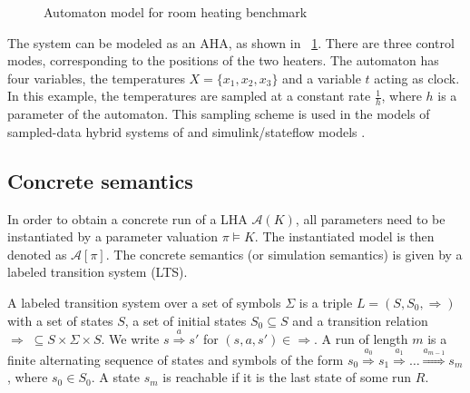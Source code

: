 \documentclass{llncs}
\newcommand{\A}{\ensuremath{\mathcal{A}}}
\newcommand{\Trans}[1]{\ensuremath{\overset{#1}{\Rightarrow}}}
\begin{document}
\begin{example}
\begin{figure}[tb]
  \caption{Automaton model for room heating benchmark}\label{fig:rhbaut}
\end{figure}

The system can be modeled as an AHA, as shown in
\figurename~\ref{fig:rhbaut}. There are three control modes, corresponding
to the positions of the two heaters. The automaton has four variables,
the temperatures $X = \{x_1, x_2, x_3\}$ and a variable $t$ acting as
clock. In this example, the temperatures are sampled at a constant
rate $\frac{1}{h}$, where $h$ is a parameter of the automaton.  This
sampling scheme is used in the models of sampled-data hybrid systems
of \cite{SK:2000} and simulink/stateflow models \cite{AKRS:2008}. 

\end{example}

\subsection{Concrete semantics}
In order to obtain a concrete run of a LHA $\A(K)$, all parameters
need to be instantiated by a parameter valuation $\pi \models K$. The
instantiated model is then denoted as $\A[\pi]$. The concrete semantics
(or simulation semantics) is given by a labeled transition system
(LTS).
\begin{definition}\label{def:lts}
  A labeled transition system over a set of symbols $\Sigma$ is a
  triple $L = (S, S_0, \Rightarrow)$ with a set of states $S$, a set
  of initial states $S_0 \subseteq S$ and a transition relation
  $\Rightarrow \; \subseteq S \times \Sigma \times S$. We write $s
  \Trans{a} s'$ for $(s, a, s') \in \Rightarrow$. A run of length $m$
  is a finite alternating sequence of states and symbols of the form
  $s_0 \Trans{a_0} s_1 \Trans{a_1} \dots \Trans{a_{m-1}} s_m$, where
  $s_0 \in S_0$. A state $s_m$ is reachable if it is the last state of
  some run $R$.
\end{definition}
\end{document}
